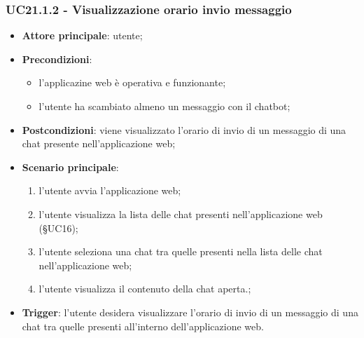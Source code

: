 \documentclass[10pt, a4paper]{article}
\begin{document}
    \subsubsection{UC21.1.2 - Visualizzazione orario invio messaggio}
    \begin{itemize}
        \item \textbf{Attore principale}: utente;
        \item \textbf{Precondizioni}: 
        \begin{itemize}
            \item l'applicazine web è operativa e funzionante;
            \item l'utente ha scambiato almeno un messaggio con il chatbot;
        \end{itemize}
        \item \textbf{Postcondizioni}: viene visualizzato l'orario di invio di un messaggio di una chat presente nell'applicazione web;
        \item \textbf{Scenario principale}:
            \begin{enumerate}
                \item l'utente avvia l'applicazione web;
                \item l'utente visualizza la lista delle chat presenti nell'applicazione web (\S UC16);
                \item l'utente seleziona una chat tra quelle presenti nella lista delle chat nell'applicazione web;
                \item l'utente visualizza il contenuto della chat aperta.;
            \end{enumerate}
        \item \textbf{Trigger}: l'utente desidera visualizzare l'orario di invio di un messaggio di una chat tra quelle presenti all'interno dell'applicazione web.
    \end{itemize}
    
\end{document}

